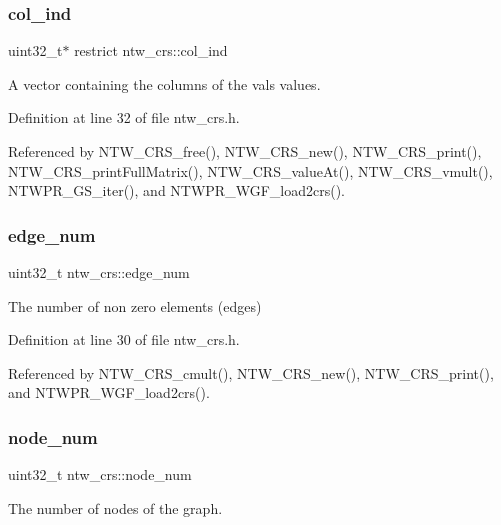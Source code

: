 \subsubsection{\texorpdfstring{col\+\_\+ind}{col\_ind}}
{\footnotesize\ttfamily uint32\+\_\+t$\ast$ restrict ntw\+\_\+crs\+::col\+\_\+ind}

A vector containing the columns of the val\textquotesingle{}s values. 

Definition at line 32 of file ntw\+\_\+crs.\+h.



Referenced by N\+T\+W\+\_\+\+C\+R\+S\+\_\+free(), N\+T\+W\+\_\+\+C\+R\+S\+\_\+new(), N\+T\+W\+\_\+\+C\+R\+S\+\_\+print(), N\+T\+W\+\_\+\+C\+R\+S\+\_\+print\+Full\+Matrix(), N\+T\+W\+\_\+\+C\+R\+S\+\_\+value\+At(), N\+T\+W\+\_\+\+C\+R\+S\+\_\+vmult(), N\+T\+W\+P\+R\+\_\+\+G\+S\+\_\+iter(), and N\+T\+W\+P\+R\+\_\+\+W\+G\+F\+\_\+load2crs().

\mbox{\label{structntw__crs_a85160ebade6d93ba77c9e90f2f237cea}} 
\subsubsection{\texorpdfstring{edge\+\_\+num}{edge\_num}}
{\footnotesize\ttfamily uint32\+\_\+t ntw\+\_\+crs\+::edge\+\_\+num}

The number of non zero elements (edges) 

Definition at line 30 of file ntw\+\_\+crs.\+h.



Referenced by N\+T\+W\+\_\+\+C\+R\+S\+\_\+cmult(), N\+T\+W\+\_\+\+C\+R\+S\+\_\+new(), N\+T\+W\+\_\+\+C\+R\+S\+\_\+print(), and N\+T\+W\+P\+R\+\_\+\+W\+G\+F\+\_\+load2crs().

\mbox{\label{structntw__crs_a36a11fbae59bf6159e40cb18e5f37ada}} 
\subsubsection{\texorpdfstring{node\+\_\+num}{node\_num}}
{\footnotesize\ttfamily uint32\+\_\+t ntw\+\_\+crs\+::node\+\_\+num}

The number of nodes of the graph. 

